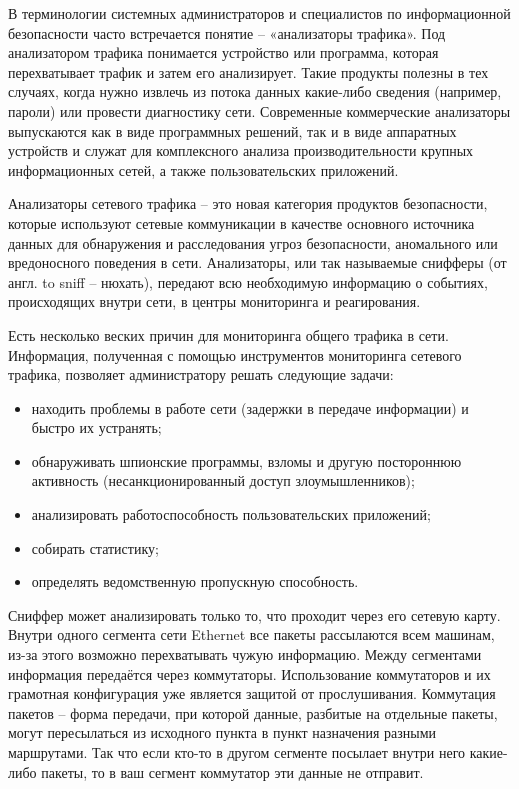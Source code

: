 \label{sec:intro}

В терминологии системных администраторов и специалистов по
информационной безопасности часто встречается понятие -- «анализаторы
трафика». Под анализатором трафика понимается устройство или программа,
которая перехватывает трафик и затем его анализирует. Такие продукты полезны
в тех случаях, когда нужно извлечь из потока данных какие-либо сведения
(например, пароли) или провести диагностику сети. Современные коммерческие
анализаторы выпускаются как в виде программных решений, так и в виде
аппаратных устройств и служат для комплексного анализа производительности
крупных информационных сетей, а также пользовательских приложений.


Анализаторы сетевого трафика -- это новая категория продуктов
безопасности, которые используют сетевые коммуникации в качестве основного
источника данных для обнаружения и расследования угроз безопасности,
аномального или вредоносного поведения в сети. Анализаторы, или так
называемые снифферы (от англ. to sniff -- нюхать), передают всю
необходимую информацию о событиях, происходящих внутри сети, в центры
мониторинга и реагирования.


Есть несколько веских причин для мониторинга общего трафика в сети.
Информация, полученная с помощью инструментов мониторинга сетевого
трафика, позволяет администратору решать следующие задачи:
\begin{itemize}
    \item находить проблемы в работе сети (задержки в передаче информации) и 
    быстро их устранять;
    \item обнаруживать шпионские программы, взломы и другую постороннюю активность 
    (несанкционированный доступ злоумышленников);
    \item анализировать работоспособность пользовательских приложений;
    \item собирать статистику;
    \item определять ведомственную пропускную способность.
\end{itemize}

Сниффер может анализировать только то, что проходит через его сетевую
карту. Внутри одного сегмента сети Ethernet все пакеты рассылаются всем
машинам, из-за этого возможно перехватывать чужую информацию. Между
сегментами информация передаётся через коммутаторы. Использование
коммутаторов и их грамотная конфигурация уже является защитой от
прослушивания. Коммутация пакетов -- форма передачи, при которой данные,
разбитые на отдельные пакеты, могут пересылаться из исходного пункта в пункт
назначения разными маршрутами. Так что если кто-то в другом сегменте
посылает внутри него какие-либо пакеты, то в ваш сегмент коммутатор эти
данные не отправит.